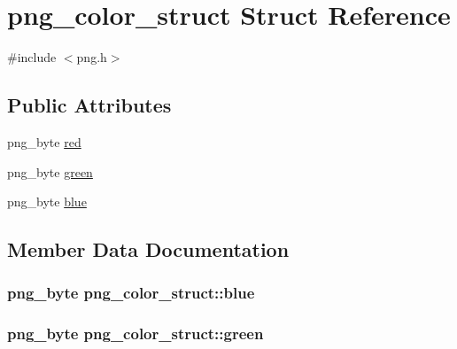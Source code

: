 \hypertarget{structpng__color__struct}{}\section{png\+\_\+color\+\_\+struct Struct Reference}
\label{structpng__color__struct}


{\ttfamily \#include $<$png.\+h$>$}

\subsection*{Public Attributes}
\begin{DoxyCompactItemize}
\item 
png\+\_\+byte \hyperlink{structpng__color__struct_ad39dc2d7cb82e3670a3ad397bb4083cb}{red}
\item 
png\+\_\+byte \hyperlink{structpng__color__struct_ada9b5a911b185eaf7c6b87934e9f11ce}{green}
\item 
png\+\_\+byte \hyperlink{structpng__color__struct_a528e625b2778e787dc182e5df1164bbc}{blue}
\end{DoxyCompactItemize}


\subsection{Member Data Documentation}
\hypertarget{structpng__color__struct_a528e625b2778e787dc182e5df1164bbc}{}
\subsubsection[{blue}]{\setlength{\rightskip}{0pt plus 5cm}png\+\_\+byte png\+\_\+color\+\_\+struct\+::blue}\label{structpng__color__struct_a528e625b2778e787dc182e5df1164bbc}
\hypertarget{structpng__color__struct_ada9b5a911b185eaf7c6b87934e9f11ce}{}
\subsubsection[{green}]{\setlength{\rightskip}{0pt plus 5cm}png\+\_\+byte png\+\_\+color\+\_\+struct\+::green}\label{structpng__color__struct_ada9b5a911b185eaf7c6b87934e9f11ce}
\hypertarget{structpng__color__struct_ad39dc2d7cb82e3670a3ad397bb4083cb}{}
